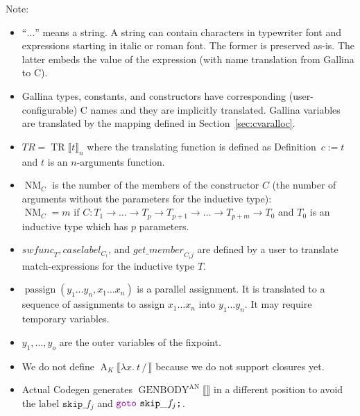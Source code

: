 \documentclass[a4paper,fleqn]{article}
\def\gallina{\textrm{Gallina}}
\def\codegen{\textrm{Codegen}}
\newcommand{\kwDefinition}{\mbox{\color{myviolet}\ttfamily Definition}}
\newcommand{\kwmatch}{\mbox{\color{mygreen}\ttfamily match}}
\newcommand{\lam}[2]{\lambda #1.~#2}
\DeclareMathOperator{\NM}{NM}
\newcommand{\BRA}[1]{\llbracket #1 \rrbracket}
\DeclareMathOperator{\genbody}{GENBODY}
\newcommand{\genbodyan}[1]{\genbody^\mathrm{AN}\BRA{#1}}
\DeclareMathOperator{\TRop}{TR}
\newcommand{\TR}[2]{\TRop\BRA{#1}_{#2}}
\newcommand{\tr}{\mathit{TR}}
\newcommand{\dq}[1]{\text{``}#1\text{''}}
\newcommand{\ttsemi}{\texttt{;}}
\newcommand{\kwgoto}{\mbox{\color{myviolet}\ttfamily goto}}
\newcommand{\secref}[1]{Section~\ref{#1}}
\DeclareMathOperator{\passign}{passign}
\DeclareMathOperator{\Aop}{A}
\newcommand{\A}[3]{\Aop_{#1}\BRA{#2\,/\,#3}}
\begin{document}
{\small Note:
\begin{itemize}
  \item $\dq{\dots}$ means a string.
    A string can contain characters in typewriter font and expressions starting in italic or roman font.
    The former is preserved as-is.
    The latter embeds the value of the expression (with name translation from \gallina{} to C).
  \item \gallina{} types, constants, and constructors have corresponding (user-configurable) C names and they are implicitly translated.
    \gallina{} variables are translated by the mapping defined in \secref{sec:cvaralloc}.
  \item $\tr = \TR{t}{n}$ where the translating function is defined as \kwDefinition~$c := t$ and $t$ is an $n$-arguments function.
  \item $\NM_C$ is the number of the members of the constructor $C$ (the number of arguments without the parameters for the inductive type): \\
    $\NM_C=m$ if $C : T_1 \rightarrow \dots \rightarrow T_p \rightarrow T_{p+1} \rightarrow \dots \rightarrow T_{p+m} \rightarrow T_0$ and $T_0$ is an inductive type which has $p$ parameters.
  \item $\mathit{swfunc}_T, \mathit{caselabel}_{C_i}$, and $\mathit{get\_member}_{C_i j}$ are defined by a user to translate \kwmatch-expressions for the inductive type $T$.
  \item $\passign(y_1\dots y_n, x_1\dots x_n)$ is a parallel assignment. It is translated to a sequence of assignments to assign $x_1\dots x_n$ into $y_1\dots y_n$.  It may require temporary variables.
  \item $y_1,\dots,y_o$ are the outer variables of the fixpoint.
  \item We do not define $\A{K}{\lam{x}{t}}{}$ because we do not support closures yet.
  \item Actual \codegen{} generates $\genbodyan{}$ in a different position to avoid the label $\mathtt{skip\_}f_j$ and $\kwgoto~\mathtt{skip\_}f_j\ttsemi$.
\end{itemize}}
\end{document}

